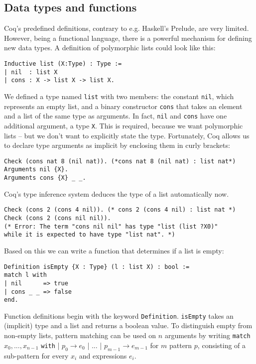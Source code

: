\documentclass{scrreprt}
\begin{document}
\subsection{Data types and functions}
Coq's predefined definitions, contrary to e.g. Haskell's Prelude, are very limited. However, being a functional language, there is a powerful mechanism for defining new data types. A definition of polymorphic lists could look like this:
\begin{verbatim}
Inductive list (X:Type) : Type :=
| nil  : list X
| cons : X -> list X -> list X.
\end{verbatim}
We defined a type named \texttt{list} with two members: the constant \texttt{nil}, which represents an empty list, and a binary constructor \texttt{cons} that takes an element and a list of the same type as arguments. In fact, \texttt{nil} and \texttt{cons} have one additional argument, a type \texttt{X}. This is required, because we want polymorphic lists -- but we don't want to explicitly state the type. Fortunately, Coq allows us to declare type arguments as implicit by enclosing them in curly brackets:
\begin{verbatim}
Check (cons nat 8 (nil nat)). (*cons nat 8 (nil nat) : list nat*)
Arguments nil {X}.
Arguments cons {X} _ _.
\end{verbatim}
Coq's type inference system deduces the type of a list automatically now.
\begin{verbatim}
Check (cons 2 (cons 4 nil)). (* cons 2 (cons 4 nil) : list nat *)
Check (cons 2 (cons nil nil)). 
(* Error: The term "cons nil nil" has type "list (list ?X0)"
while it is expected to have type "list nat". *)
\end{verbatim}
Based on this we can write a function that determines if a list is empty:
\begin{verbatim}
Definition isEmpty {X : Type} (l : list X) : bool := 
match l with
| nil      => true
| cons _ _ => false
end.
\end{verbatim}
Function definitions begin with the keyword \texttt{Definition}. \texttt{isEmpty} takes an (implicit) type and a list and returns a boolean value.
To distinguish empty from non-empty lists, pattern matching can be used on $n$ arguments by writing \texttt{match} $x_{0},...,x_{n-1}$ \texttt{with} | $p_{0} \rightarrow e_{0}$ | ... | $p_{m-1} \rightarrow e_{m-1}$ for $m$ pattern $p$, consisting of a sub-pattern for every $x_{i}$ and expressions $e_{i}$.
\end{document}

